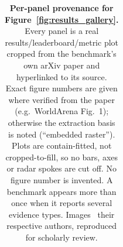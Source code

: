 \begin{table}[t]
{\begin{tabular}{@{}l l l@{}}
\bottomrule
\end{tabular}}
\caption{\textbf{Per-panel provenance for Figure~\ref{fig:results_gallery}.} Every panel is a real
results/leaderboard/metric plot cropped from the benchmark's own arXiv paper and hyperlinked to its
source. Exact figure numbers are given where verified from the paper (e.g.\ WorldArena Fig.~1);
otherwise the extraction basis is noted (``embedded raster''). Plots are contain-fitted, not
cropped-to-fill, so no bars, axes or radar spokes are cut off. No figure number is invented. A
benchmark appears more than once when it reports several evidence types. Images \textcopyright\ their
respective authors, reproduced for scholarly review.}
\label{tab:results_provenance}
\end{table}
